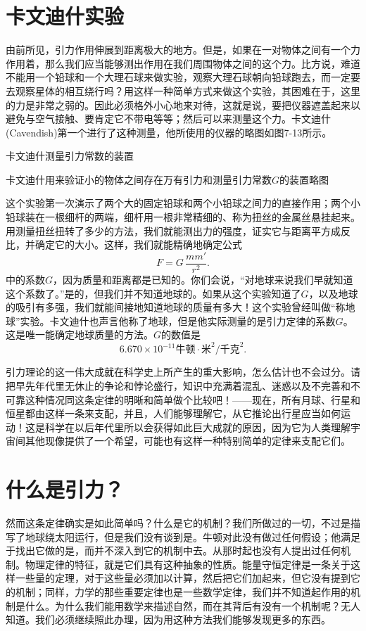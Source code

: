 \documentclass[12pt,oneside]{book}
\begin{document}
\section{卡文迪什实验}
由前所见，引力作用伸展到距离极大的地方。但是，如果在一对物体之间有一个力作用着，那么我们应当能够测出作用在我们周围物体之间的这个力。比方说，难道不能用一个铅球和一个大理石球来做实验，观察大理石球朝向铅球跑去，而一定要去观察星体的相互绕行吗？用这样一种简单方式来做这个实验，其困难在于，这里的力是非常之弱的。因此必须格外小心地来对待，这就是说，要把仪器遮盖起来以避免与空气接触、要肯定它不带电等等；然后可以来测量这个力。卡文迪什(Cavendish)第一个进行了这种测量，他所使用的仪器的略图如图7-13所示。
\begin{fig}{卡文迪什测量引力常数的装置}
\caption{卡文迪什用来验证小的物体之间存在万有引力和测量引力常数$G$的装置略图}
\label{fig:卡文迪什测量引力常数的装置}
\end{fig}
这个实验第一次演示了两个大的固定铅球和两个小铅球之间力的直接作用；两个小铅球装在一根细杆的两端，细杆用一根非常精细的、称为扭丝的金属丝悬挂起来。用测量扭丝扭转了多少的方法，我们就能测出力的强度，证实它与距离平方成反比，并确定它的大小。这样，我们就能精确地确定公式
\begin{equation*}
F=G\,\frac{mm'}{r^2}.
\end{equation*}
中的系数$G$，因为质量和距离都是已知的。你们会说，“对地球来说我们早就知道这个系数了。”是的，但我们并不知道地球的。如果从这个实验知道了$G$，以及地球的吸引有多强，我们就能间接地知道地球的质量有多大！这个实验曾经叫做“称地球”实验。卡文迪什也声言他称了地球，但是他实际测量的是引力定律的系数$G$。这是唯一能确定地球质量的方法。$G$的数值是
\begin{equation*}
6.670\times10^{-11}\text{牛顿}\cdot\text{米}^2/\text{千克}^2.
\end{equation*}

引力理论的这一伟大成就在科学史上所产生的重大影响，怎么估计也不会过分。请把早先年代里无休止的争论和悖论盛行，知识中充满着混乱、迷惑以及不完善和不可靠这种情况同这条定律的明晰和简单做个比较吧！——现在，所有月球、行星和恒星都由这样一条来支配，并且，人们能够理解它，从它推论出行星应当如何运动！这是科学在以后年代里所以会获得如此巨大成就的原因，因为它为人类理解宇宙间其他现像提供了一个希望，可能也有这样一种特别简单的定律来支配它们。


\section{什么是引力？}
然而这条定律确实是如此简单吗？什么是它的机制？我们所做过的一切，不过是描写了地球绕太阳运行，但是我们没有谈到是。牛顿对此没有做过任何假设；他满足于找出它做的是，而并不深入到它的机制中去。从那时起也没有人提出过任何机制。物理定律的特征，就是它们具有这种抽象的性质。能量守恒定律是一条关于这样一些量的定理，对于这些量必须加以计算，然后把它们加起来，但它没有提到它的机制；同样，力学的那些重要定律也是一些数学定律，我们并不知道起作用的机制是什么。为什么我们能用数学来描述自然，而在其背后有没有一个机制呢？无人知道。我们必须继续照此办理，因为用这种方法我们能够发现更多的东西。
\end{document}

